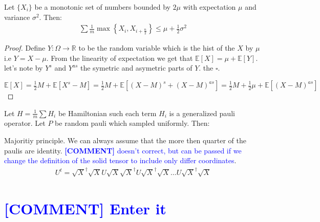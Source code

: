 \documentclass{article}
\newcommand{\commentt}[1]{\textcolor{blue}{ \textbf{[COMMENT]} #1}}
\newcommand{\ctt}[1]{\commentt{#1}}
\begin{document}
      \begin{lemma} Let \(\{X_{i}\}\) be a monotonic set of numbers bounded by \(2\mu\) with expectation \( \mu \) and variance \( \sigma^2 \). Then:
	\begin{equation*}
	  \begin{split}
	    \sum{ \frac{1}{m}\max{ \left\{ X_{i}, X_{i+ \frac{n}{2}} \right\} } } \le \mu + \frac{1}{2}\sigma^2  
	  \end{split}
	\end{equation*}
      \end{lemma}
      \begin{proof} Define \(Y : \Omega \rightarrow \mathbb{R} \) to be the random  variable which is the hist of the \(X\) by \(\mu\) i.e \(Y = X -\mu\). From the linearity of expectation we get that \(\mathbb{E}[X] = \mu + \mathbb{E}[Y]\). let's note by \(Y^{s}\) and \(Y^{as}\) the symetric and asymetric parts of \(Y\). the \(\square\). 

	\( \mathbb{E}[X] = \frac{1}{2}M + \mathbb{E}[X^{s} - M] = \frac{1}{2}M + \mathbb{E}[(X-M)^{s} + (X-M)^{as}] = \frac{1}{2}M + \frac{1}{2}\mu + \mathbb{E}[(X-M)^{as}] \) 
      \end{proof}
      \begin{lemma} Let \( H = \frac{1}{m}\sum{H_{i}}\) be Hamiltonian such each term \(H_{i}\) is a generalized pauli operator. Let \(P\) be random pauli which sampled uniformly. Then:   
      \end{lemma}

      \begin{lemma} Majoritiy principle. We can always assume that the more then quarter of the paulis are identity.  \ctt{ doesn't correct, but can be passed if we change the definition of the solid tensor to include only differ coordinates}.
	\begin{equation*}
	  \begin{split}
	    U^{t} = \sqrt{X}^\dagger\sqrt{X}U\sqrt{X}\sqrt{X}^\dagger U \sqrt{X}^\dagger\sqrt{X} ... U \sqrt{X}^\dagger\sqrt{X}
	  \end{split}
	\end{equation*}
      \end{lemma}
      \section{\ctt{Enter it}}
\end{document}
